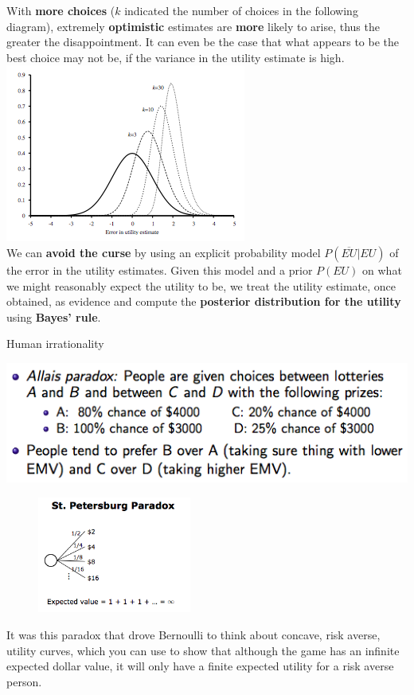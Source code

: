\documentclass[12pt]{article}
\begin{document}
\begin{tcolorbox}
With \textbf{more choices} ($k$ indicated the number of choices in the following diagram), extremely \textbf{optimistic} estimates are \textbf{more} likely to arise, thus the greater the disappointment. It can even be the case that what appears to be the best choice may not be, if the variance in the utility estimate is high. \\

\includegraphics[scale=0.7]{p13}\\

We can \textbf{avoid the curse} by using an explicit probability model $P(\overline{EU} | EU)$ of the error in the utility estimates. Given this model and a prior $P(EU)$ on what we might reasonably expect the utility to be, we treat the utility estimate, once obtained, as evidence and compute the \textbf{posterior distribution for the utility} using \textbf{Bayes' rule}. 
\end{tcolorbox}

\noindent
{\large{Human irrationality}}
\begin{tcolorbox}
\includegraphics[scale=0.6]{p14}
\end{tcolorbox}

\begin{tcolorbox}
\begin{figure}
    \centering
    \includegraphics[width=0.45\textwidth]{p15}
\end{figure}
It was this paradox that drove Bernoulli to think about concave, risk averse,
utility curves, which you can use to show that although the game has an
infinite expected dollar value, it will only have a finite expected utility for a
risk averse person.
\end{tcolorbox}
\end{document}
